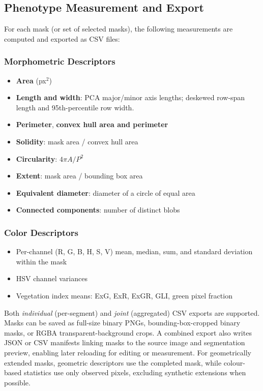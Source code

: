 \documentclass[12pt, a4paper]{article}
\begin{document}
\subsection{Phenotype Measurement and Export}

For each mask (or set of selected masks), the following measurements are
computed and exported as CSV files:

\subsubsection{Morphometric Descriptors}
\begin{itemize}
    \item \textbf{Area} (px$^2$)
    \item \textbf{Length and width}: PCA major/minor axis lengths; deskewed
          row-span length and 95th-percentile row width.
    \item \textbf{Perimeter}, \textbf{convex hull area and perimeter}
    \item \textbf{Solidity}: mask area / convex hull area
    \item \textbf{Circularity}: $4\pi A / P^2$
    \item \textbf{Extent}: mask area / bounding box area
    \item \textbf{Equivalent diameter}: diameter of a circle of equal area
    \item \textbf{Connected components}: number of distinct blobs
\end{itemize}

\subsubsection{Color Descriptors}
\begin{itemize}
    \item Per-channel (R, G, B, H, S, V) mean, median, sum, and standard
          deviation within the mask
    \item HSV channel variances
    \item Vegetation index means: ExG, ExR, ExGR, GLI, green pixel fraction
\end{itemize}

Both \textit{individual} (per-segment) and \textit{joint} (aggregated) CSV exports are supported. Masks can be saved as full-size binary PNGs, bounding-box-cropped binary masks, or RGBA transparent-background crops. A combined export also writes JSON or CSV manifests linking masks to the source image and segmentation preview, enabling later reloading for editing or measurement. For geometrically extended masks, geometric descriptors use the completed mask, while colour-based statistics use only observed pixels, excluding synthetic extensions when possible.
\end{document}
